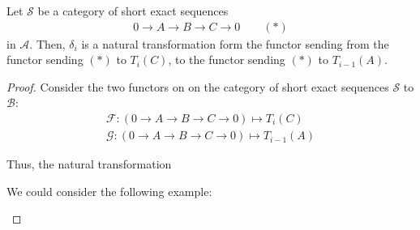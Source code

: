 \documentclass[Total.tex]{subfiles}
\begin{document}
			\begin{proposition}
				Let $\mathcal{S}$ be a category of short exact sequences
				\begin{gather*}
					0\rightarrow A\rightarrow B\rightarrow C\rightarrow 0\qquad(*)
				\end{gather*}
				in $\mathcal{A}$. Then, $\delta_i$ is a natural transformation form the functor sending from the functor sending $(*)$ to $T_i(C)$, to the functor sending $(*)$ to $T_{i-1}(A)$.
			\end{proposition}
			\begin{proof}
				Consider the two functors on on the category of short exact sequences $\mathcal{S}$ to $\mathcal{B}$:
				\begin{gather*}
					\mathcal{F}:(0\rightarrow A\rightarrow B\rightarrow C\rightarrow 0)\mapsto T_i(C)\\
					\mathcal{G}:(0\rightarrow A\rightarrow B\rightarrow C\rightarrow 0)\mapsto T_{i-1}(A)
				\end{gather*} 
				
				Thus, the natural transformation
				\begin{center}
				\end{center}
				
				We could consider the following example: 
				\begin{center}
				\end{center}
			\end{proof}
			
\end{document}
